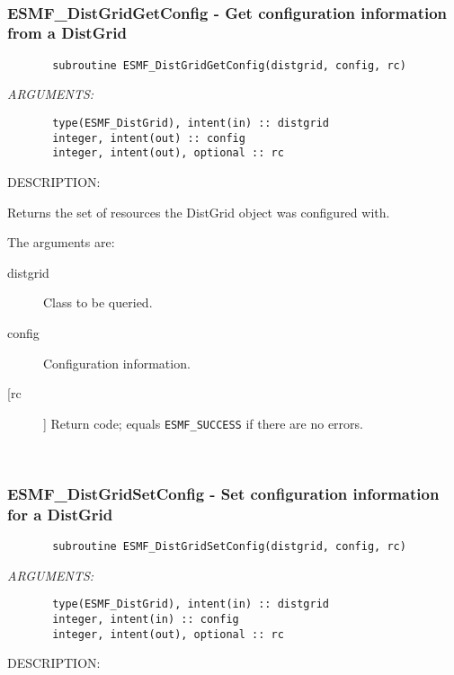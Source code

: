  
\mbox{}\hrulefill\ 
 
\subsubsection{ESMF\_DistGridGetConfig - Get configuration information from a DistGrid}


 
\begin{verbatim}       subroutine ESMF_DistGridGetConfig(distgrid, config, rc)\end{verbatim}{\em ARGUMENTS:}
\begin{verbatim}       type(ESMF_DistGrid), intent(in) :: distgrid
       integer, intent(out) :: config   
       integer, intent(out), optional :: rc              \end{verbatim}
{\sf DESCRIPTION:\\ }


       Returns the set of resources the DistGrid object was configured with.
  
       The arguments are:
       \begin{description}
       \item[distgrid] 
            Class to be queried.
       \item[config]
            Configuration information.         
       \item[[rc]] 
            Return code; equals {\tt ESMF\_SUCCESS} if there are no errors.
       \end{description}
   
 
\mbox{}\hrulefill\ 
 
\subsubsection{ESMF\_DistGridSetConfig - Set configuration information for a DistGrid}


 
\begin{verbatim}       subroutine ESMF_DistGridSetConfig(distgrid, config, rc)\end{verbatim}{\em ARGUMENTS:}
\begin{verbatim}       type(ESMF_DistGrid), intent(in) :: distgrid
       integer, intent(in) :: config   
       integer, intent(out), optional :: rc             
 \end{verbatim}
{\sf DESCRIPTION:\\ }


